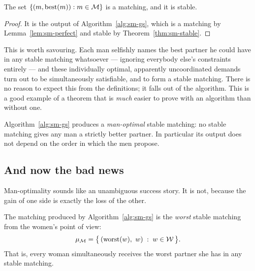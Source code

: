 \begin{corollary}\label{cor:sm-1}
The set $\{(m, \mathrm{best}(m)) : m \in \mathcal{M}\}$ is a matching, and it is
stable.
\end{corollary}

\begin{proof}
It is the output of Algorithm~\ref{alg:sm-gs}, which is a matching by
Lemma~\ref{lem:sm-perfect} and stable by Theorem~\ref{thm:sm-stable}.
\end{proof}

This is worth savouring. Each man selfishly names the best partner he could
have in any stable matching whatsoever --- ignoring everybody else's
constraints entirely --- and these individually optimal, apparently
uncoordinated demands turn out to be simultaneously satisfiable, and to form a
stable matching. There is no reason to expect this from the definitions; it
falls out of the algorithm. This is a good example of a theorem that is
\emph{much} easier to prove with an algorithm than without one.

\begin{corollary}\label{cor:sm-2}
Algorithm~\ref{alg:sm-gs} produces a \emph{man-optimal} stable matching: no
stable matching gives any man a strictly better partner. In particular its
output does not depend on the order in which the men propose.
\end{corollary}

\subsection{And now the bad news}

Man-optimality sounds like an unambiguous success story. It is not, because
the gain of one side is exactly the loss of the other.

\begin{corollary}\label{cor:sm-3}
The matching produced by Algorithm~\ref{alg:sm-gs} is the \emph{worst} stable
matching from the women's point of view:
\[
  \mu_{\mathcal{M}} = \bigl\{\,(\mathrm{worst}(w),\ w) \;:\; w \in \mathcal{W} \,\bigr\}.
\]
That is, every woman simultaneously receives the worst partner she has in any
stable matching.
\end{corollary}

